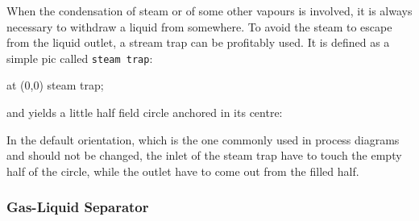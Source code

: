 \documentclass[12pt]{article}						%
\newcommand*{\chpn}[1]{\texttt{#1}}				%
\newcommand*{\chpp}[1]{\texttt{#1}}				%
\begin{document}
When the condensation of steam or of some other vapours is involved, it is always
necessary to withdraw a liquid from somewhere. To avoid the steam to escape from
the liquid outlet, a stream trap can be profitably used. It is defined as a
simple pic called \chpp{steam trap}:
\begin{chpcode}
	\pic at (0,0) {steam trap};
\end{chpcode}
and yields a little half field circle anchored in its centre:
\begin{center}
\end{center}

In the default orientation, which is the one commonly used in process diagrams
and should not be changed, the inlet of the steam trap have to touch the empty
half of the circle, while the outlet have to come out from the filled half.

\subsubsection{Gas-Liquid Separator}
\end{document}
